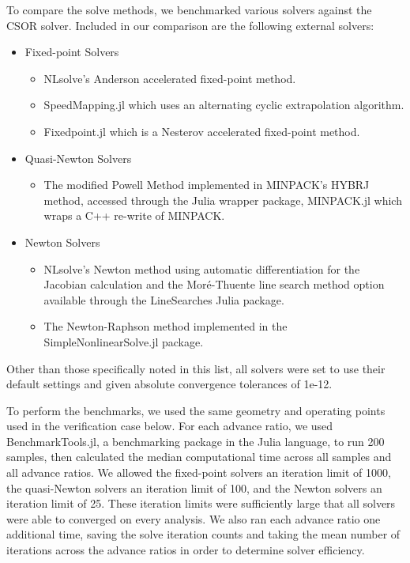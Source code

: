 To compare the solve methods, we benchmarked various solvers against the CSOR solver.
%
Included in our comparison are the following external solvers:
%
\begin{itemize}
    \item Fixed-point Solvers
        \begin{itemize}
        \item NLsolve's Anderson accelerated fixed-point method.
        \item SpeedMapping.jl which uses an alternating cyclic extrapolation algorithm.
        \item Fixedpoint.jl which is a Nesterov accelerated fixed-point method.
        \end{itemize}
    \item Quasi-Newton Solvers
        \begin{itemize}
            \item The modified Powell Method implemented in MINPACK's HYBRJ method, accessed through the Julia wrapper package, MINPACK.jl which wraps a C++ re-write of MINPACK.
        \end{itemize}
    \item Newton Solvers
        \begin{itemize}
        \item NLsolve's Newton method using automatic differentiation for the Jacobian calculation and the Mor\'{e}-Thuente line search method option available through the LineSearches Julia package.
        \item The Newton-Raphson method implemented in the SimpleNonlinearSolve.jl package.
    \end{itemize}
\end{itemize}
%
\noindent Other than those specifically noted in this list, all solvers were set to use their default settings and given absolute convergence tolerances of 1e-12.


To perform the benchmarks, we used the same geometry and operating points used in the verification case below.
%
For each advance ratio, we used BenchmarkTools.jl, a benchmarking package in the Julia language, to run 200 samples, then calculated the median computational time across all samples and all advance ratios.
%
We allowed the fixed-point solvers an iteration limit of 1000, the quasi-Newton solvers an iteration limit of 100, and the Newton solvers an iteration limit of 25.
%
These iteration limits were sufficiently large that all solvers were able to converged on every analysis.
%
We also ran each advance ratio one additional time, saving the solve iteration counts and taking the mean number of iterations across the advance ratios in order to determine solver efficiency.
%

